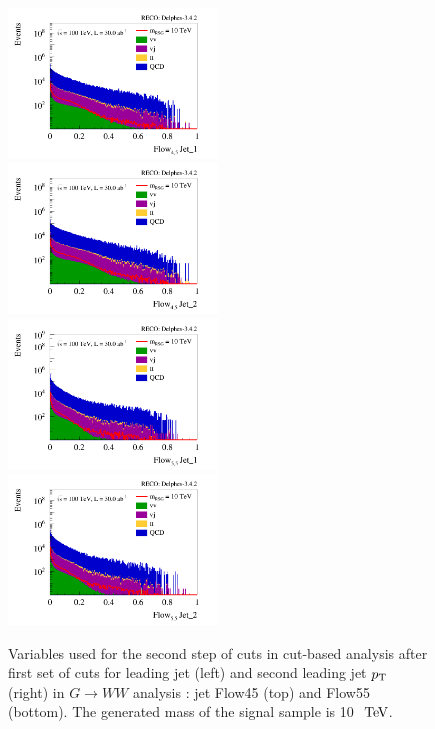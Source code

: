 \documentclass{cernrep}
\begin{document}
\begin{figure}[!htb]\centering
\includegraphics[width=0.495\textwidth]{Fig/RSGww/cut/Jet1_Flow45_sel1_nostack_log.png}
\includegraphics[width=0.495\textwidth]{Fig/RSGww/cut/Jet2_Flow45_sel1_nostack_log.png}
\includegraphics[width=0.495\textwidth]{Fig/RSGww/cut/Jet1_Flow55_sel1_nostack_log.png}
\includegraphics[width=0.495\textwidth]{Fig/RSGww/cut/Jet2_Flow55_sel1_nostack_log.png}
\caption{Variables used for the second step of cuts in cut-based analysis after first set of cuts for leading jet (left) and second leading jet $p\sb{\scriptstyle\mathrm{T}}$ (right) in $G \rightarrow WW$ analysis : jet Flow45 (top) and Flow55 (bottom). The generated mass of the signal sample is 10 $\TeV$.}
\label{fig:RSGww_sel1_cut}
\end{figure}
\end{document}

